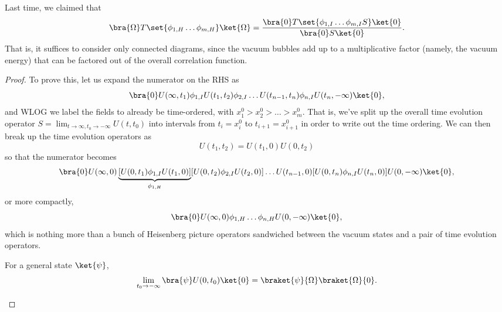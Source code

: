 
Last time, we claimed that
$$\bra{\Omega}T\set{\phi_{1,H}\ldots \phi_{m,H}}\ket{\Omega}=\frac{\bra{0}T \set{\phi_{1,I}\ldots \phi_{m,I}S}\ket{0}}{\bra{0}S\ket{0}}.$$
That is, it suffices to consider only connected diagrams, since the vacuum bubbles add up to a multiplicative factor (namely, the vacuum energy) that can be factored out of the overall correlation function.
\begin{proof}
To prove this, let us expand the numerator on the RHS as
$$\bra{0}U(\infty, t_1) \phi_{1,I} U(t_1,t_2)\phi_{2,I} \ldots U(t_{n-1},t_n)\phi_{n,I} U(t_n,-\infty)\ket{0},$$
and WLOG we label the fields to already be time-ordered, with $x_1^0 > x_2^0 > \ldots > x_m^0$. That is, we've split up the overall time evolution operator $S=\lim_{t\to \infty, t_0\to-\infty} U(t,t_0)$ into intervals from $t_i=x_i^0$ to $t_{i+1}=x_{i+1}^0$ in order to write out the time ordering. We can then break up the time evolution operators as
$$U(t_1,t_2)=U(t_1,0)U(0,t_2)$$ 
so that the numerator becomes
$$\bra{0}U(\infty, 0) \underbrace{[U(0,t_1)\phi_{1,I} U(t_1,0)]}_{\phi_{1,H}} [U(0,t_2)\phi_{2,I} U(t_2,0)]\ldots U(t_{n-1},0)[U(0,t_n)\phi_{n,I} U(t_n,0)]U(0,-\infty)\ket{0},$$
or more compactly,
\begin{equation}\label{greenfnnumerator}
    \bra{0}U(\infty,0)\phi_{1,H}\ldots \phi_{n,H} U(0,-\infty)\ket{0},
\end{equation}
which is nothing more than a bunch of Heisenberg picture operators sandwiched between the vacuum states and a pair of time evolution operators.
\begin{lem}
For a general state $\ket{\psi}$,
\begin{equation}
    \lim_{t_0\to-\infty} \bra{\psi}U(0,t_0)\ket{0}=\braket{\psi}{\Omega}\braket{\Omega}{0}.
\end{equation}
\end{lem}

\end{proof}
